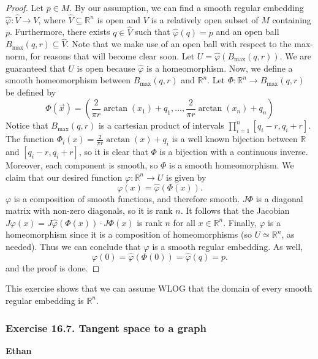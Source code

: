 \documentclass{article}
\theoremstyle{plain} %
\numberwithin{thm}{section} %
\theoremstyle{definition}
\begin{document}
    \begin{proof}
        Let \(p \in M\). By our assumption, we can find a smooth regular embedding \(\hat{\varphi}: \hat{V} \to V\), where \(\hat{V} \subseteq \mathbb{R}^n\) is open and \(V\) is a relatively open subset of \(M\) containing \(p\). Furthermore, there exists \(q \in \hat{V}\) such that \(\hat{\varphi}(q) = p\) and an open ball \(B_{\max}(q, r) \subseteq \hat{V}\). Note that we make use of an open ball with respect to the max-norm, for reasons that will become clear soon. Let \(U = \hat{\varphi}(B_{\max}(q, r))\). We are guaranteed that \(U\) is open because \(\hat{\varphi}\) is a homeomorphism. Now, we define a smooth homeomorphism between \(B_{\max}(q, r)\) and \(\mathbb{R}^n\). Let \(\Phi : \mathbb{R}^n \to B_{\max}(q, r)\) be defined by
        \[
            \Phi (\vec{x}) = \left( \frac{2}{\pi r}\arctan (x_1) + q_1, ..., \frac{2}{\pi r}\arctan (x_n) + q_n\right) 
        \]
        Notice that \(B_{\max}(q, r)\) is a cartesian product of intervals \(\prod _{i=1}^n [q_i - r, q_i + r]\). The function \(\Phi_i(x) = \frac{2}{\pi r}\arctan (x) + q_i\) is a well known bijection between \(\mathbb{R}\) and \([q_i - r, q_i + r]\), so it is clear that \(\Phi\) is a bijection with a continuous inverse. Moreover, each component is smooth, so \(\Phi\) is a smooth homeomorphism. We claim that our desired function \(\varphi: \mathbb{R}^n \to U\) is given by
        \[
            \varphi (x) = \hat{\varphi}(\Phi (x)).
        \]
        \(\varphi\) is a composition of smooth functions, and therefore smooth. \(J \Phi\) is a diagonal matrix with non-zero diagonals, so it is rank \(n\). It follows that the Jacobian \(J \varphi (x) = J \hat{\varphi}(\Phi (x)) \cdot J \Phi (x)\) is rank \(n\) for all \(x \in \mathbb{R}^n\). Finally, \(\varphi\) is a homeomorphism since it is a composition of homeomorphisms (so \(U \simeq \mathbb{R}^n\), as needed). Thus we can conclude that \(\varphi\) is a smooth regular embedding. As well,
        \[
            \varphi (0) = \hat{\varphi}(\Phi (0)) = \hat{\varphi}(q) = p.
        \]
        and the proof is done.

    \end{proof}
    This exercise shows that we can assume WLOG that the domain of every smooth regular embedding is \(\mathbb{R}^n\).

    \subsubsection{Exercise 16.7. Tangent space to a graph}
    \textbf{Ethan}
\end{document}
